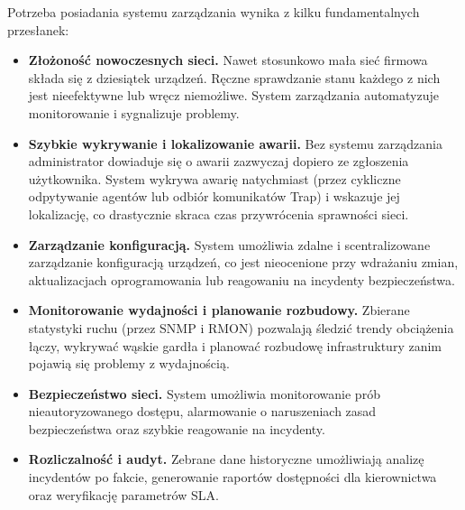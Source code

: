 \documentclass[12pt,a4paper]{article}
\begin{document}
Potrzeba posiadania systemu zarządzania wynika z kilku fundamentalnych
przesłanek:

\begin{itemize}
  \item \textbf{Złożoność nowoczesnych sieci.} Nawet stosunkowo mała sieć
        firmowa składa się z dziesiątek urządzeń. Ręczne sprawdzanie stanu
        każdego z nich jest nieefektywne lub wręcz niemożliwe. System
        zarządzania automatyzuje monitorowanie i sygnalizuje problemy.
  \item \textbf{Szybkie wykrywanie i lokalizowanie awarii.} Bez systemu
        zarządzania administrator dowiaduje się o awarii zazwyczaj dopiero
        ze zgłoszenia użytkownika. System wykrywa awarię natychmiast (przez
        cykliczne odpytywanie agentów lub odbiór komunikatów Trap) i wskazuje
        jej lokalizację, co drastycznie skraca czas przywrócenia sprawności
        sieci.
  \item \textbf{Zarządzanie konfiguracją.} System umożliwia zdalne i scentralizowane
        zarządzanie konfiguracją urządzeń, co jest nieocenione przy wdrażaniu
        zmian, aktualizacjach oprogramowania lub reagowaniu na incydenty
        bezpieczeństwa.
  \item \textbf{Monitorowanie wydajności i planowanie rozbudowy.} Zbierane
        statystyki ruchu (przez SNMP i RMON) pozwalają śledzić trendy obciążenia
        łączy, wykrywać wąskie gardła i planować rozbudowę infrastruktury
        zanim pojawią się problemy z wydajnością.
  \item \textbf{Bezpieczeństwo sieci.} System umożliwia monitorowanie prób
        nieautoryzowanego dostępu, alarmowanie o naruszeniach zasad bezpieczeństwa
        oraz szybkie reagowanie na incydenty.
  \item \textbf{Rozliczalność i audyt.} Zebrane dane historyczne umożliwiają
        analizę incydentów po fakcie, generowanie raportów dostępności dla
        kierownictwa oraz weryfikację parametrów SLA.
\end{itemize}
\end{document}
